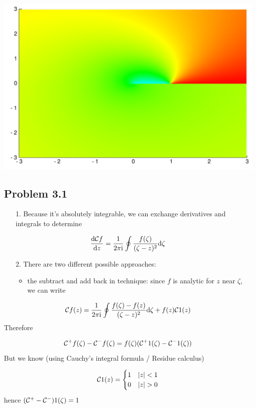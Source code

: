 \documentclass[12pt,a4paper]{article}
\def\D{ {\rm d} }
\def\I{ {\rm i} }
\def\CC{ {\cal C} }
\begin{document}
\includegraphics[width=\linewidth]{figures/Solutions2_26_1.pdf}

\subsection{Problem 3.1}
\begin{itemize}
\item[1. ] Because it's absolutely integrable, we can exchange derivatives and integrals to determine

\end{itemize}
\[
{\D \CC f \over \D z} = {1 \over 2 \pi \I} \oint {f(\zeta)\over (\zeta-z)^2} \D \zeta
\]
\begin{itemize}
\item[2. ] There are two different possible approaches:

\begin{itemize}
\item the subtract and add back in technique: since $f$ is analytic for $z$ near $\zeta$, we can write

\end{itemize}
\end{itemize}
\[
\CC f(z) = {1 \over 2 \pi \I} \oint {f(\zeta)-f(z) \over (\zeta-z)^2} \D \zeta + f(z) \CC 1(z)
\]
Therefore

\[
\CC^+ f(\zeta) - \CC^- f(\zeta) = f(\zeta)( \CC^+ 1(\zeta) - \CC^- 1(\zeta))
\]
But we know (using Cauchy's integral formula / Residue calculus)

\[
\CC 1(z) = \begin{cases} 1 & |z| < 1 \\
                            0 & |z| > 0
                            \end{cases}
\]
hence $(\CC^+-\CC^-)1(\zeta) = 1$
\end{document}
